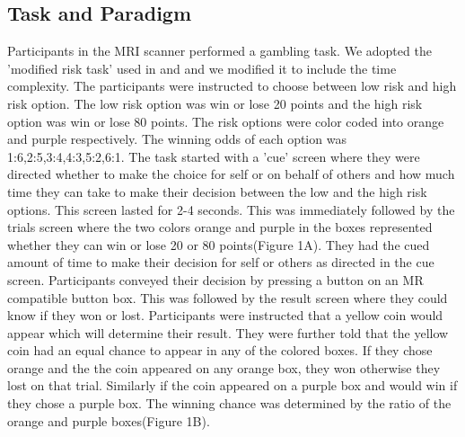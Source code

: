 \documentclass[11pt]{article}
\begin{document}
\subsection{Task and Paradigm}
Participants in the MRI scanner performed a gambling task. We adopted the 'modified risk task' used in \citet{knoch2006disruption} and \citet{jung2013dissociable} and we modified it to include the time complexity. The participants were instructed to choose between low risk and high risk option. The low risk option was win or lose 20 points and the high risk option was win or lose 80 points. The risk options were color coded into orange and purple respectively. The winning odds of each option was 1:6,2:5,3:4,4:3,5:2,6:1. The task started with a 'cue' screen where they were directed whether to make the choice for self or on behalf of others and how much time they can take to make their decision between the low and the high risk options. This screen lasted for 2-4 seconds. This was immediately followed by the trials screen where the two colors orange and purple in the boxes represented whether they can win or lose 20 or 80 points(Figure 1A). They had the cued amount of time to make their decision for self or others as directed in the cue screen. Participants conveyed their decision by pressing a button on an MR compatible button box. This was followed by the result screen where they could know if they won or lost. Participants were instructed that a yellow coin would appear which will determine their result. They were further told that the yellow coin had an equal chance to appear in any of the colored boxes. If they chose orange and the the coin appeared on any orange box, they won otherwise they lost on that trial. Similarly if the coin appeared on a purple box and would win if they chose a purple box. The winning chance was determined by the ratio of the orange and purple boxes(Figure 1B). \\
\end{document}
